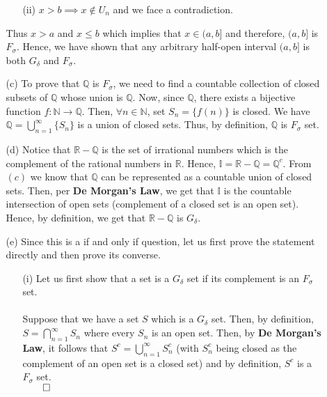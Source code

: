 \documentclass[11pt]{article}
\newcommand{\nats}{\mathbb{N}}
\newcommand{\reals}{\mathbb{R}}
\newcommand{\rats}{\mathbb{Q}}
\newcommand{\irrats}{\mathbb{I}}
\begin{document}
\begin{itemize}
\begin{itemize}
\begin{itemize}
                    \item[(ii)]
                        $x > b \implies x \notin U_n$ and we face a
                        contradiction.
                \end{itemize}
                Thus $x > a$ and $x \leq b$ which implies that $x \in (a, b]$
                and therefore, $(a, b]$ is $F_\sigma$. Hence, we have shown
                that any arbitrary half-open interval $(a, b]$ is both
                $G_\delta$ and $F_\sigma$.

            \item[(c)]
                To prove that $\rats$ is $F_\sigma$, we need to find a
                countable collection of closed subsets of $\rats$ whose union
                is $\rats$. Now, since $\rats$, there exists a bijective
                function $f : \nats \to \rats$. Then, $\forall n \in \nats$,
                set $S_n = \{f(n)\}$ is closed. We have $\rats =
                \displaystyle\bigcup_{n = 1}^{\infty} \{S_n\}$ is a union of
                closed sets. Thus, by definition, $\rats$ is $F_\sigma$ set.

            \item[(d)]
                Notice that $\reals - \rats$ is the set of irrational numbers
                which is the complement of the rational numbers in $\reals$.
                Hence, $\irrats = \reals - \rats = \rats^c$. From $(c)$ we know
                that $\rats$ can be represented as a countable union of closed
                sets. Then, per \textbf{De Morgan's Law}, we get that $\irrats$
                is the countable intersection of open sets (complement of a
                closed set is an open set). Hence, by definition, we get that
                $\reals - \rats$ is $G_\delta$.

            \item[(e)]
                Since this is a if and only if question, let us first prove
                the statement directly and then prove its converse.
                \begin{itemize}
                    \item[(i)]
                        Let us first show that a set is a $G_\delta$ set if
                        its complement is an $F_\sigma$ set.
                        \\
                        \\
                        Suppose that we have a set $S$ which is a $G_\delta$
                        set. Then, by definition, $S = \displaystyle\bigcap_{n
                        = 1}^{\infty}S_n$ where every $S_n$ is an open set.
                        Then, by \textbf{De Morgan's Law}, it follows that $S^c
                        = \displaystyle\bigcup_{n = 1}^{\infty}S_n^c$ (with
                        $S_n^c$ being closed as the complement of an open set
                        is a closed set) and by definition, $S^c$ is a
                        $F_\sigma$ set.\\
                        $\qed$


\end{itemize}
\end{itemize}
\end{itemize}
\end{document}
